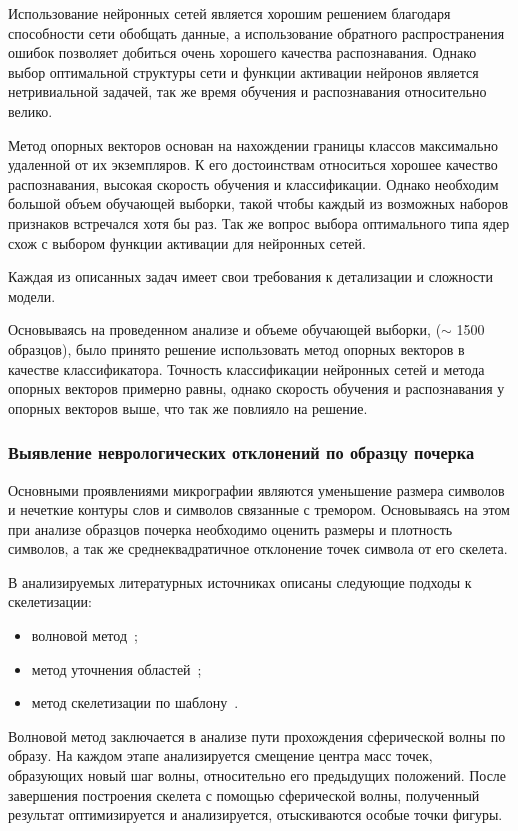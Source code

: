 Использование нейронных сетей является хорошим решением благодаря способности сети обобщать данные, а использование обратного распространения ошибок позволяет добиться очень хорошего качества распознавания. Однако выбор оптимальной структуры сети и функции активации нейронов является нетривиальной задачей, так же время обучения и распознавания относительно велико.

Метод опорных векторов основан на нахождении границы классов максимально удаленной от их экземпляров. К его достоинствам относиться хорошее качество распознавания, высокая скорость обучения и классификации. Однако необходим большой объем обучающей выборки, такой чтобы каждый из возможных наборов признаков встречался хотя бы раз. Так же вопрос выбора оптимального типа ядер схож с выбором функции активации для нейронных сетей.

Каждая из описанных задач имеет свои требования к детализации и сложности модели.

Основываясь на проведенном анализе и объеме обучающей выборки, ($\sim$ 1500 образцов), было принято решение использовать метод опорных векторов в качестве классификатора. Точность классификации нейронных сетей и метода опорных векторов примерно равны, однако скорость обучения и распознавания у опорных векторов выше, что так же повлияло на решение.

\subsubsection{Выявление неврологических отклонений по образцу почерка}
Основными проявлениями микрографии являются уменьшение размера символов и нечеткие контуры слов и символов связанные с тремором. Основываясь на этом при анализе образцов почерка необходимо оценить размеры и плотность символов, а так же среднеквадратичное отклонение точек символа от его скелета.

В анализируемых литературных источниках описаны следующие подходы к скелетизации:
\begin{itemize}
  \item волновой метод~\cite{klybkov};
  \item метод уточнения областей~\cite{gonsales_wygs};
  \item метод скелетизации по шаблону~\cite{pfalz_rosenfeld}.
\end{itemize}

Волновой метод заключается в анализе пути прохождения сферической волны по образу. На каждом этапе анализируется смещение центра масс точек, образующих новый шаг волны, относительно его предыдущих положений. После завершения построения скелета с помощью сферической волны, полученный результат оптимизируется и анализируется, отыскиваются особые точки фигуры.

